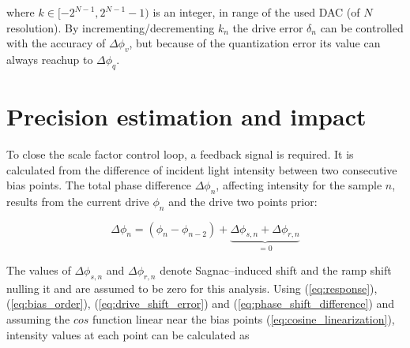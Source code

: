 \documentclass[journal,twoside,web]{ieeecolor}
\begin{document}
\noindent
where $k \in [-2^{N-1}, 2^{N-1}-1)$ is an integer, in range of the used DAC (of $N$ resolution). By incrementing/decrementing $k_{n}$ the drive error $\delta_{n}$ can be controlled with the accuracy of $\Delta\phi_{v}$, but because of the quantization error its value can always reachup to $\Delta\phi_{q}$.

\section{Precision estimation and impact}
\label{sec:precision_estimation_and_impact}
To close the scale factor control loop, a feedback signal is required. It is calculated from the difference of incident light intensity between two consecutive bias points. The total phase difference $\Delta\phi_{n}$, affecting intensity for the sample $n$, results from the current drive $\phi_{n}$ and the drive two points prior:

\begin{equation}
    \Delta\phi_{n} = (\phi_{n} - \phi_{n-2}) + \underbrace{\Delta\phi_{s, n} + \Delta\phi_{r, n}}_{=0}
    \label{eq:phase_shift_difference}
\end{equation}

\noindent
The values of $\Delta\phi_{s, n}$ and $\Delta\phi_{r, n}$ denote Sagnac--induced shift and the ramp shift nulling it and are assumed to be zero for this analysis. Using (\ref{eq:response}), (\ref{eq:bias_order}), (\ref{eq:drive_shift_error}) and (\ref{eq:phase_shift_difference}) and assuming the $cos$ function linear near the bias points (\ref{eq:cosine_linearization}), intensity values at each point can be calculated as
\end{document}
